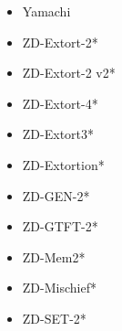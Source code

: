 \begin{appendices}
\begin{multicols}{4}
\begin{itemize}
            \item Yamachi
            \item ZD-Extort-2*
            \item ZD-Extort-2 v2*
            \item ZD-Extort-4*
            \item ZD-Extort3*
            \item ZD-Extortion*
            \item ZD-GEN-2*
            \item ZD-GTFT-2*
            \item ZD-Mem2*
            \item ZD-Mischief*
            \item ZD-SET-2*
        \end{itemize}
    \end{multicols}


\end{appendices}
